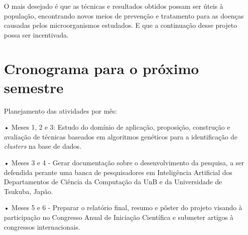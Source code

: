 O mais desejado é que as técnicas e resultados obtidos possam ser úteis à população, encontrando novos meios de prevenção e tratamento para as doenças causadas pelos microorganismos estudados. E que a continuação desse projeto possa ser incentivada.

\section{Cronograma para o próximo semestre}
Planejamento das atividades por mês:

• Meses 1, 2 e 3: Estudo do domínio de aplicação, proposição, construção e avaliação de técnicas baseados em algoritmos genéticos para a identificação de {\it clusters} na base de dados. 

• Meses 3 e 4 - Gerar documentação sobre o desenvolvimento da pesquisa, a ser defendida perante uma banca de pesquisadores em Inteligência Artificial dos Departamentos de Ciência da Computação da UnB e da Universidade de Tsukuba, Japão.

• Meses 5 e 6 - Preparar o relatório final, resumo e pôster do projeto visando à participação no Congresso Anual de Iniciação Científica e submeter artigos à congressos internacionais.